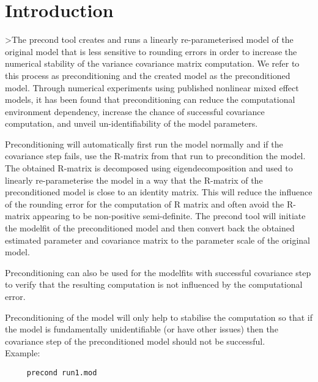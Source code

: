 
\usepackage{color}
\usepackage{amsmath}
\usepackage{tikz}
\usetikzlibrary{shapes,arrows}




\maketitle

\section{Introduction}

>The precond tool creates and runs a linearly re-parameterised model of the original model that is less sensitive to rounding errors in order to increase the numerical stability of the variance covariance matrix computation. We refer to this process as preconditioning and the created model as the preconditioned model. Through numerical experiments\cite{Aoki} using published nonlinear mixed effect models, it has been found that preconditioning can reduce the computational environment dependency, increase the chance of successful covariance computation, and unveil un-identifiability of the model parameters.

Preconditioning will automatically first run the model normally and if the covariance step fails, use the R-matrix from that run to precondition the model. The obtained R-matrix is decomposed using eigendecomposition and used to linearly re-parameterise the model in a way that the R-matrix of the preconditioned model is close to an identity matrix.  This will reduce the influence of the rounding error for the computation of R matrix and often avoid the R-matrix appearing to be non-positive semi-definite. The precond tool will initiate the modelfit of the preconditioned model and then convert back the obtained estimated parameter and covariance matrix to the parameter scale of the original model.

Preconditioning can also be used for the modelfits with successful covariance step to verify that the resulting computation is not influenced by the computational error.

Preconditioning of the model will only help to stabilise the computation so that if the model is fundamentally unidentifiable (or have other issues) then the covariance step of the preconditioned model should not be successful.\\
Example:
\begin{verbatim}
     precond run1.mod
\end{verbatim}

